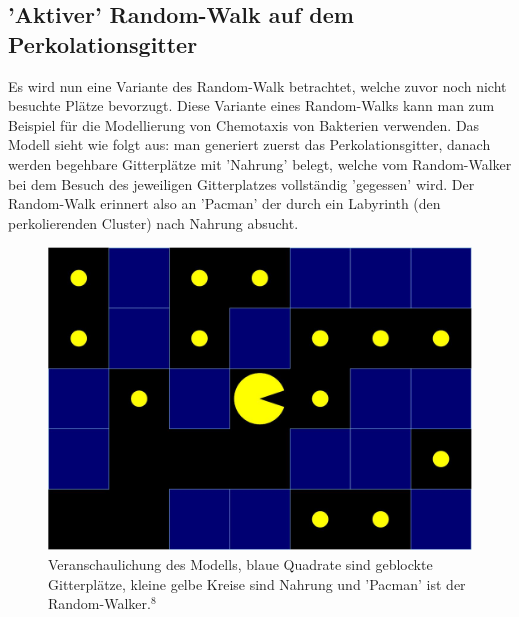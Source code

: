 \documentclass[a4paper, 12pt]{report}
\begin{document}
\subsection{'Aktiver' Random-Walk auf dem Perkolationsgitter}
Es wird nun eine Variante des Random-Walk betrachtet, welche zuvor noch nicht besuchte Plätze bevorzugt. Diese Variante eines Random-Walks kann man zum Beispiel für die Modellierung von Chemotaxis von Bakterien verwenden. Das Modell sieht wie folgt aus: man generiert zuerst das Perkolationsgitter, danach werden begehbare Gitterplätze mit 'Nahrung' belegt, welche vom Random-Walker bei dem Besuch des jeweiligen Gitterplatzes vollständig 'gegessen' wird. Der Random-Walk erinnert also an 'Pacman' der durch ein Labyrinth (den perkolierenden Cluster) nach Nahrung absucht.
\begin{figure}[h!]
	\centering
	\includegraphics[scale=0.25]{pacman.png}
	\caption{Veranschaulichung des Modells, blaue Quadrate sind geblockte Gitterplätze, kleine gelbe Kreise sind Nahrung und 'Pacman' ist der Random-Walker.$^8$}
\end{figure}
\newpage
\end{document}
